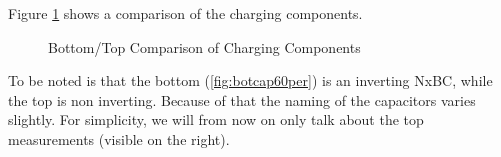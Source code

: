 Figure \ref{fig:bottopcharge} shows a comparison of the charging components.

\begin{figure}[H]%
    \centering
   \qquad
    \caption{Bottom/Top Comparison of Charging Components}%
     \label{fig:bottopcharge}%
\end{figure}

To be noted is that the bottom (\ref{fig:botcap60per}) is an inverting NxBC,
while the top is non inverting.
Because of that the naming of the capacitors varies slightly.
For simplicity,
we will from now on only talk about the top measurements (visible on the right).

